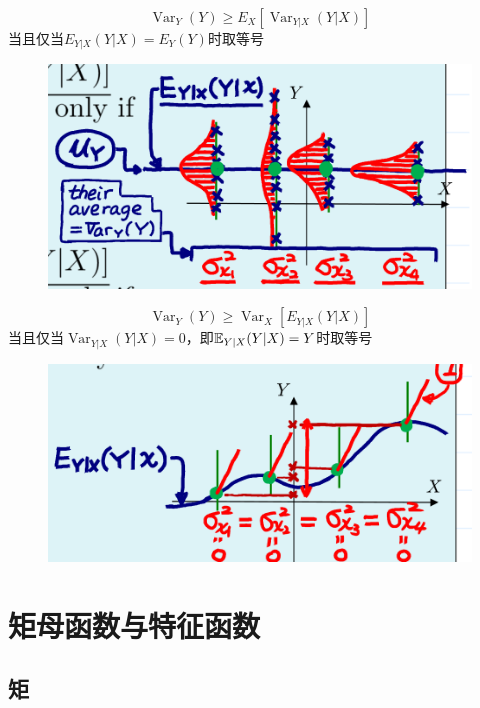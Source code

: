 \begin{corollary}
    \[ \operatorname{Var}_Y(Y) \ge E_X[\operatorname{Var}_{Y|X}(Y|X)] \]
    当且仅当$E_{Y|X}(Y|X)=E_Y(Y)$时取等号
\end{corollary}

\begin{figure}
    \centering
    \includegraphics{image/var_dec2.png}
\end{figure}

\begin{corollary}
    \[ \operatorname{Var}_Y(Y) \ge \operatorname{Var}_X[E_{Y|X}(Y|X)] \]
    当且仅当$\operatorname{Var}_{Y|X}(Y|X)=0$，即$\mathbb{E}_{Y|X}(Y|X)=Y$时取等号
\end{corollary}

\begin{figure}
    \centering
    \includegraphics{image/var_dec3.png}
\end{figure}

\section{矩母函数与特征函数}

\subsection{矩}

